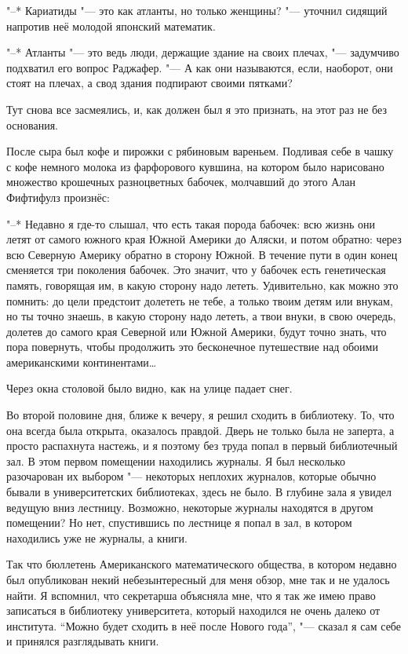 "--* Кариатиды "--- это как атланты, но только женщины? "--- уточнил сидящий
напротив неё молодой японский математик.

"--* Атланты "--- это ведь люди, держащие здание на своих плечах, "---
задумчиво подхватил его вопрос Раджафер.
"--- А как они называются, если, наоборот, они стоят на плечах, а свод здания
подпирают своими пятками?

Тут снова все засмеялись, и, как должен был я это признать, на этот раз не без
основания.

После сыра был кофе и пирожки с рябиновым вареньем.
Подливая себе в чашку с кофе немного молока из фарфорового кувшина, на котором
было нарисовано множество крошечных разноцветных бабочек, молчавший до этого
Алан Фифтифулз произнёс:

"--* Недавно я где-то слышал, что есть такая порода бабочек:
всю жизнь они летят от самого южного края Южной Америки до Аляски, и потом
обратно: через всю Северную Америку обратно в сторону Южной.
В течение пути в один конец сменяется три поколения бабочек.
Это значит, что у бабочек есть генетическая память, говорящая им, в какую
сторону надо лететь.
Удивительно, как можно это помнить:
до цели предстоит долететь не тебе, а только твоим детям или внукам, но ты точно
знаешь, в какую сторону надо лететь, а твои внуки, в свою очередь, долетев до
самого края Северной или Южной Америки, будут точно знать, что пора повернуть,
чтобы продолжить это бесконечное путешествие над обоими американскими
континентами\ldots

Через окна столовой было видно, как на улице падает снег.

Во второй половине дня, ближе к вечеру, я решил сходить в библиотеку.
То, что она всегда была открыта, оказалось правдой.
Дверь не только была не заперта, а просто распахнута настежь, и я поэтому без
труда попал в первый библиотечный зал.
В этом первом помещении находились журналы.
Я был несколько разочарован их выбором "--- некоторых неплохих журналов,
которые обычно бывали в университетских библиотеках, здесь не было.
В глубине зала я увидел ведущую вниз лестницу.
Возможно, некоторые журналы находятся в другом помещении?
Но нет, спустившись по лестнице я попал в зал, в котором находились уже не
журналы, а книги.

Так что бюллетень Американского математического общества, в котором недавно был
опубликован некий небезынтересный для меня обзор, мне так и не удалось найти.
Я вспомнил, что секретарша объясняла мне, что я так же имею право записаться в
библиотеку университета, который находился не очень далеко от института.
\enquote{Можно будет сходить в неё после Нового года}, "--- сказал я сам себе и
принялся разглядывать книги.

